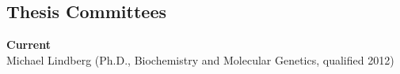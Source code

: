 \documentclass[margin,line]{cv}
\begin{document}
\begin{resume}
    \section{\mysidestyle Thesis Committees}
    \textbf{Current} \\
    Michael Lindberg (Ph.D., Biochemistry and Molecular Genetics, qualified 2012)
    
    

\end{resume}
\end{document}
